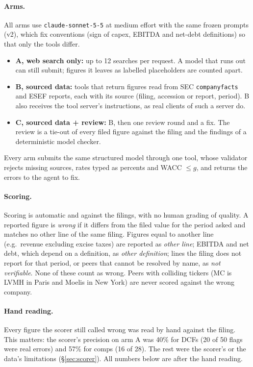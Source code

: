 \documentclass[10pt,a4paper]{article}
\begin{document}
\paragraph{Arms.} All arms use \texttt{claude-sonnet-5-5} at medium effort with the same frozen prompts (v2), which
fix conventions (sign of capex, EBITDA and net-debt definitions) so that only the tools differ.
\begin{itemize}
  \item \textbf{A, web search only:} up to 12 searches per request. A model that runs out can still submit; figures
        it leaves as labelled placeholders are counted apart.
  \item \textbf{B, sourced data:} tools that return figures read from SEC \texttt{companyfacts} and ESEF reports, each
        with its source (filing, accession or report, period). B also receives the tool server's instructions, as
        real clients of such a server do.
  \item \textbf{C, sourced data + review:} B, then one review round and a fix. The review is a tie-out of every filed
        figure against the filing and the findings of a deterministic model checker.
\end{itemize}
Every arm submits the same structured model through one tool, whose validator rejects missing sources, rates typed
as percents and WACC $\le g$, and returns the errors to the agent to fix.

\paragraph{Scoring.} Scoring is automatic and against the filings, with no human grading of quality. A reported
figure is \emph{wrong} if it differs from the filed value for the period asked and matches no other line of the same
filing. Figures equal to another line (e.g.\ revenue excluding excise taxes) are reported as \emph{other line};
EBITDA and net debt, which depend on a definition, as \emph{other definition}; lines the filing does not report for
that period, or peers that cannot be resolved by name, as \emph{not verifiable}. None of these count as wrong. Peers
with colliding tickers (MC is LVMH in Paris and Moelis in New York) are never scored against the wrong company.

\paragraph{Hand reading.} Every figure the scorer still called wrong was read by hand against the filing. This
matters: the scorer's precision on arm A was 40\% for DCFs (20 of 50 flags were real errors) and 57\% for comps
(16 of 28). The rest were the scorer's or the data's limitations (\S\ref{sec:scorer}). All numbers below are after
the hand reading.
\end{document}
